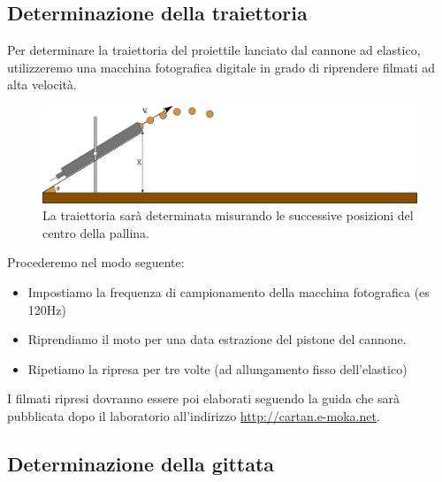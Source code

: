 \documentclass[a4paper,10pt,oneside]{article}
\begin{document}
\subsection{Determinazione della traiettoria}
Per determinare la traiettoria del proiettile lanciato dal cannone ad elastico,  utilizzeremo una macchina fotografica digitale in grado di riprendere filmati ad alta velocità. 
\begin{figure}[H]
 \centering
 \includegraphics[width=\textwidth]{./Immagini/cannone3.png}
 \caption{La traiettoria sarà determinata misurando le successive posizioni del centro della pallina.}
 \label{fig:cannone3}
\end{figure}
Procederemo nel modo seguente:
\begin{itemize}
 \item Impostiamo la frequenza di campionamento della macchina fotografica (es 120Hz)
\item Riprendiamo il moto per una data estrazione del pistone del cannone.
\item Ripetiamo la ripresa per tre volte (ad allungamento fisso dell'elastico)
\end{itemize}
I filmati ripresi dovranno essere poi elaborati seguendo la guida che sarà pubblicata dopo il laboratorio all'indirizzo \url{http://cartan.e-moka.net}.

\subsection{Determinazione della gittata}
\end{document}
